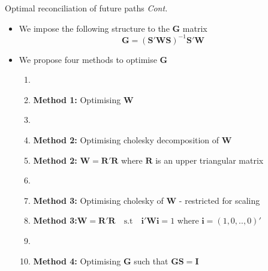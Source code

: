 \documentclass[11pt,xcolor=dvipsnames,handout]{beamer} %
\begin{document}
\begin{frame}{Optimal reconciliation of future paths \textit{Cont.}}
\begin{itemize}[<+-| alert@+>]
\item We impose the following structure to the $\bm{G}$ matrix
\begin{equation}\label{eq:2}
\bm{G}=\left(\bm{S}'\bm{W}\bm{S}\right)^{-1}{\bm S'}\bm{W}
\end{equation}
\item We propose four methods to optimise $\bm{G}$
\begin{enumerate}
	\item[]
	\item[] \textbf{\color{Maroon}Method 1:} Optimising $\bm{W}$
	\item[] 
	\item[] \textbf{\color{Maroon}Method 2:} Optimising cholesky decomposition of $\bm{W}$
	\item[] \textbf{\color{White}Method 2:} $\bm{W}=\bm{R'R}$ where $\bm{R}$ is an upper triangular matrix 
	\item[]
	\item[] \textbf{\color{Maroon}Method 3:} Optimising cholesky of $\bm{W}$ - restricted for scaling
	\item[] \textbf{\color{White}Method 3:}$\bm{W}=\bm{R'R} \quad \text{s.t} \quad \bm{i'Wi}=1$ where $\bm{i}=(1,0,..,0)'$
	\item[] 
	\item[] \textbf{\color{Maroon}Method 4:} Optimising $\bm{G}$ such that $\bm{GS=I}$
	
\end{enumerate}
\end{itemize}
\end{frame}

\end{document}
